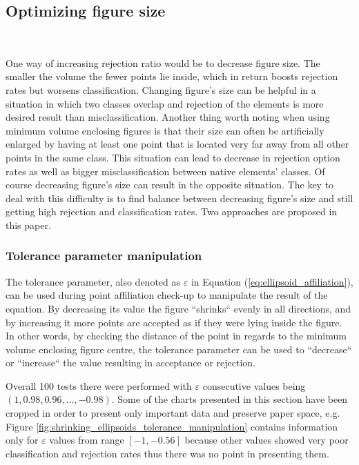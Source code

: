 \subsection{Optimizing figure size} \ \label{size_optimizing}

One way of increasing rejection ratio would be to decrease figure size. The smaller the volume the fewer points lie inside, which in return boosts rejection rates but worsens classification. Changing figure's size can be helpful in a situation in which two classes overlap and rejection of the elements is more desired result than misclassification. Another thing worth noting when using minimum volume enclosing figures is that their size can often be artificially enlarged by having at least one point that is located very far away from all other points in the same class. This situation can lead to decrease in rejection option rates as well as bigger misclassification between native elements' classes. Of course decreasing figure's size can result in the opposite situation. The key to deal with this difficulty is to find balance between decreasing figure's size and still getting high rejection and classification rates. Two approaches are proposed in this paper.

\subsubsection{Tolerance parameter manipulation}

The tolerance parameter, also denoted as $\varepsilon$ in Equation (\ref{eq:ellipsoid_affiliation}), can be used during point affiliation check-up to manipulate the result of the equation. By decreasing its value the figure ``shrinks`` evenly in all directions, and by increasing it more points are accepted as if they were lying inside the figure. In other words, by checking the distance of the point in regards to the minimum volume enclosing figure centre, the tolerance parameter can be used to ``decrease`` or ``increase`` the value resulting in acceptance or rejection.

Overall 100 tests there were performed with $\varepsilon$ consecutive values being~$(1, 0.98, 0.96, \dots, -0.98)$. Some of the charts presented in this section have been cropped in order to present only important data and preserve paper space, e.g. Figure \ref{fig:shrinking_ellipsoids_tolerance_manipulation} contains information only for $\varepsilon$ values from range $[-1, -0.56]$ because other values showed very poor classification and rejection rates thus there was no point in presenting them.

